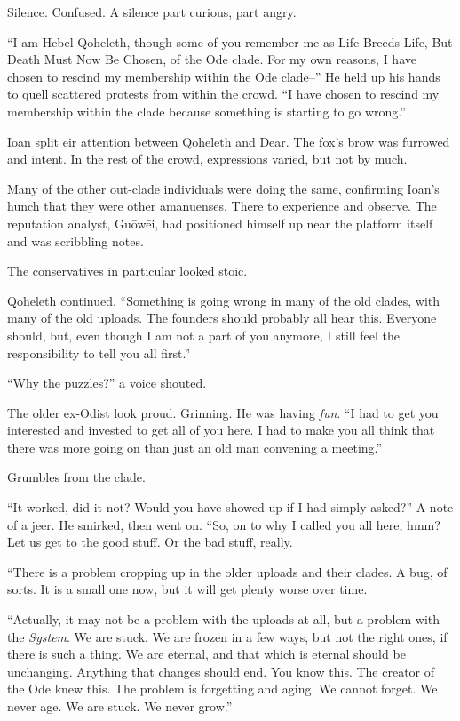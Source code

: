 Silence. Confused. A silence part curious, part angry.

``I am Hebel Qoheleth, though some of you remember me as Life Breeds Life, But Death Must Now Be Chosen, of the Ode clade. For my own reasons, I have chosen to rescind my membership within the Ode clade--'' He held up his hands to quell scattered protests from within the crowd. ``I have chosen to rescind my membership within the clade because something is starting to go wrong.''

Ioan split eir attention between Qoheleth and Dear. The fox's brow was furrowed and intent. In the rest of the crowd, expressions varied, but not by much.

Many of the other out-clade individuals were doing the same, confirming Ioan's hunch that they were other amanuenses. There to experience and observe. The reputation analyst, Guōwēi, had positioned himself up near the platform itself and was scribbling notes.

The conservatives in particular looked stoic.

Qoheleth continued, ``Something is going wrong in many of the old clades, with many of the old uploads. The founders should probably all hear this. Everyone should, but, even though I am not a part of you anymore, I still feel the responsibility to tell you all first.''

``Why the puzzles?'' a voice shouted.

The older ex-Odist look proud. Grinning. He was having \emph{fun}. ``I had to get you interested and invested to get all of you here. I had to make you all think that there was more going on than just an old man convening a meeting.''

Grumbles from the clade.

``It worked, did it not? Would you have showed up if I had simply asked?'' A note of a jeer. He smirked, then went on. ``So, on to why I called you all here, hmm? Let us get to the good stuff. Or the bad stuff, really.

``There is a problem cropping up in the older uploads and their clades. A bug, of sorts. It is a small one now, but it will get plenty worse over time.

``Actually, it may not be a problem with the uploads at all, but a problem with the \emph{System}. We are stuck. We are frozen in a few ways, but not the right ones, if there is such a thing. We are eternal, and that which is eternal should be unchanging. Anything that changes should end. You know this. The creator of the Ode knew this. The problem is forgetting and aging. We cannot forget. We never age. We are stuck. We never grow.''

